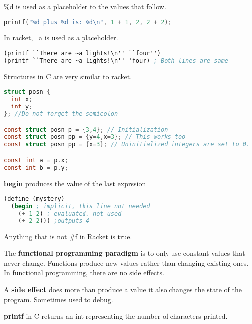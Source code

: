 \documentclass[english, 12pt]{article}
\begin{document}
\begin{defn}
\%d is used as a placeholder to the values that follow.
\begin{lstlisting}[language=C]
printf("%d plus %d is: %d\n", 1 + 1, 2, 2 + 2);
\end{lstlisting}
In racket, ~a is used as a placeholder.
\begin{lstlisting}[language=Scheme]
(printf ``There are ~a lights!\n'' ``four'')
(printf ``There are ~a lights!\n'' 'four) ; Both lines are same
\end{lstlisting}
\end{defn}


\begin{defn}
Structures in C are very similar to racket. 
\begin{lstlisting}[language=C]
struct posn {
  int x;
  int y;
}; //Do not forget the semicolon

const struct posn p = {3,4}; // Initialization
const struct posn pp = {y=4,x=3}; // This works too
const struct posn pp = {x=3}; // Uninitialized integers are set to 0.

const int a = p.x;
const int b = p.y;
\end{lstlisting}
\end{defn}


\begin{defn}
\textbf{begin} produces the value of the last exprssion
\begin{lstlisting}[language=Scheme]
(define (mystery)
  (begin ; implicit, this line not needed
    (+ 1 2) ; evaluated, not used
    (+ 2 2))) ;outputs 4
\end{lstlisting}
\end{defn}
\begin{qte}
Anything that is not \#f in Racket is true.
\end{qte}

\begin{defn}
The \textbf{functional programming paradigm} is to only use constant values that never change. Functions produce new values rather than changing existing ones. In functional programming, there are no side effects.
\end{defn}

\begin{defn}
A \textbf{side effect} does more than produce a value it also changes the state of the program. Sometimes used to debug.
\end{defn}

\begin{defn}
\textbf{printf} in C returns an int representing the number of characters printed.
\end{defn}
\end{document}
